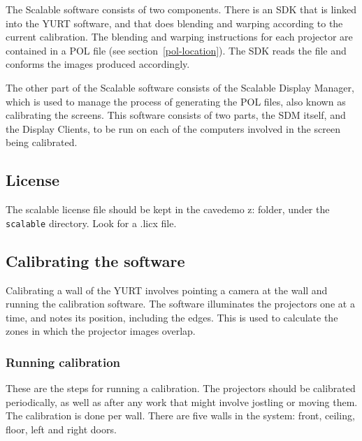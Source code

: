 \documentclass[11pt]{article}
\newcommand{\yurt}{YURT\xspace}
\newcommand{\cmd}[1]{\texttt{#1}\xspace}
\begin{document}
The Scalable software consists of two components.  There is an SDK
that is linked into the \yurt software, and that does blending and
warping according to the current calibration.  The blending and
warping instructions for each projector are contained in a POL file
(see section~\ref{pol-location}).  The SDK reads the file and conforms
the images produced accordingly.

The other part of the Scalable software consists of the Scalable
Display Manager, which is used to manage the process of generating the
POL files, also known as calibrating the screens.  This software
consists of two parts, the SDM itself, and the Display Clients,
to be run on each of the computers involved in the screen being
calibrated.  

\subsection{License}

The scalable license file should be kept in the cavedemo z: folder,
under the \cmd{scalable} directory.  Look for a .licx file.

\subsection{Calibrating the software}

Calibrating a wall of the \yurt involves pointing a camera at the wall
and running the calibration software.  The software illuminates the
projectors one at a time, and notes its position, including the edges.
This is used to calculate the zones in which the projector images
overlap.

\subsubsection{Running calibration}

These are the steps for running a calibration.  The projectors should
be calibrated periodically, as well as after any work that might
involve jostling or moving them.  The calibration is done per wall.
There are five walls in the system: front, ceiling, floor, left and
right doors.
\end{document}
